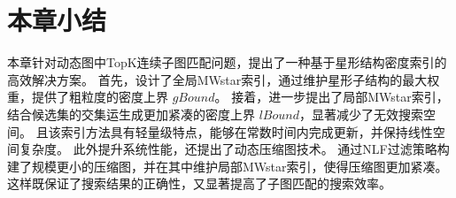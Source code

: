 \section{本章小结}
本章针对动态图中TopK连续子图匹配问题，提出了一种基于星形结构密度索引的高效解决方案。
首先，设计了全局MWstar索引，通过维护星形子结构的最大权重，提供了粗粒度的密度上界 $gBound$。
接着，进一步提出了局部MWstar索引，结合候选集的交集运生成更加紧凑的密度上界 $lBound$，显著减少了无效搜索空间。
且该索引方法具有轻量级特点，能够在常数时间内完成更新，并保持线性空间复杂度。
此外提升系统性能，还提出了动态压缩图技术。
通过NLF过滤策略构建了规模更小的压缩图，并在其中维护局部MWstar索引，使得压缩图更加紧凑。
这样既保证了搜索结果的正确性，又显著提高了子图匹配的搜索效率。
